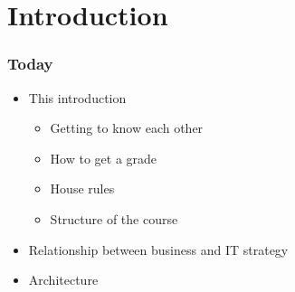 


\maketitle

\section{Introduction}
\begin{frame}[fragile]
  \frametitle{Today}
\begin{itemize}
	\item This introduction
	\begin{itemize}
		\item Getting to know each other
		\item How to get a grade
		\item House rules
		\item Structure of the course
	\end{itemize}
	\item Relationship between business and IT strategy
	\item Architecture
\end{itemize}
	
\end{frame}

